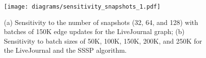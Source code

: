 \begin{figure}[!ht]
    \centering
    \texttt{[image: diagrams/sensitivity\_snapshots\_1.pdf]}
    \vspace{-0.175in}
    \caption{(a) Sensitivity to the number of snapshots (32, 64, and 128) with batches of 150K edge updates for the LiveJournal graph; (b) Sensitivity to batch sizes of 50K, 100K, 150K, 200K, and 250K for the LiveJournal and the SSSP algorithm.}
    \label{sensitivity-snapshots}
    \vspace{-0.25in}
\end{figure}
